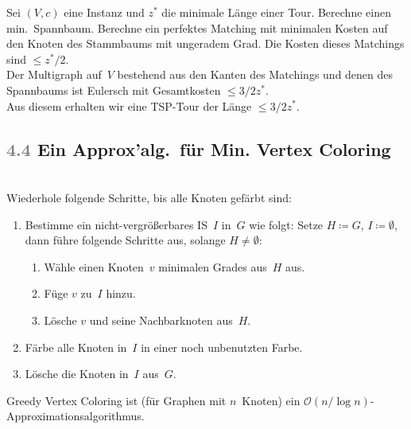 \documentclass{cheat-sheet}
\renewcommand{\O}{\mathcal{O}} %
\newcommand{\Algorithm}[1]{\textcolor{AlgorithmColor}{\textbf{#1}}}
\newcommand{\Problem}[1]{\textcolor{ProblemColor}{\textbf{#1}}}
\newcommand{\scriptSection}[1]{\textcolor{gray}{#1}\enspace}
\begin{document}
\begin{samepage}

\begin{beweisskizze}
  Sei $(V, c)$ eine Instanz und $z^*$ die minimale Länge einer Tour.
  Berechne einen min.\ Spannbaum.
  Berechne ein perfektes Matching mit minimalen Kosten auf den Knoten des Stammbaums mit ungeradem Grad.
  Die Kosten dieses Matchings sind $\leq z^* / 2$. \\
  Der Multigraph auf~$V$ bestehend aus den Kanten des Matchings und denen des Spannbaums ist Eulersch mit Gesamtkosten $\leq 3/2 z^*$. \\
  Aus diesem erhalten wir eine TSP-Tour der Länge $\leq 3/2 z^*$.
\end{beweisskizze}

\subsection{\scriptSection{4.4} Ein Approx'alg.\ für \Problem{Min. Vertex Coloring}}

\begin{alg}[\Algorithm{Greedy Vertex Coloring}] \mbox{}\\
  Wiederhole folgende Schritte, bis alle Knoten gefärbt sind:
  \begin{enumerate}
    \item
      Bestimme ein nicht-vergrößerbares IS~$I$ in~$G$ wie folgt: Setze $H \coloneqq G$, $I \coloneqq \emptyset$, dann führe folgende Schritte aus, solange $H \neq \emptyset$:
      \begin{enumerate}
        \item Wähle einen Knoten~$v$ minimalen Grades aus~$H$ aus.
        \item Füge $v$ zu~$I$ hinzu.
        \item Lösche $v$ und seine Nachbarknoten aus~$H$.
      \end{enumerate}
    \item Färbe alle Knoten in~$I$ in einer noch unbenutzten Farbe.
    \item Lösche die Knoten in~$I$ aus~$G$.
  \end{enumerate}
\end{alg}

\end{samepage}

\begin{satz}
  Greedy Vertex Coloring ist (für Graphen mit $n$~Knoten) ein $\O(n / \log n)$-Approximationsalgorithmus.
\end{satz}
\end{document}
